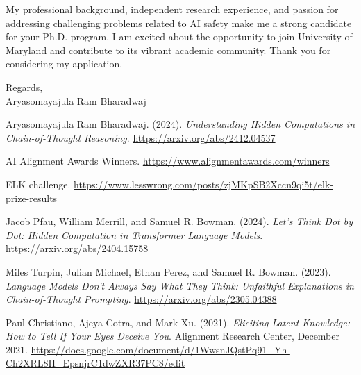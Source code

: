 \documentclass[12pt]{article}
\begin{document}
My professional background, independent research experience, and passion for addressing challenging problems related to AI safety make me a strong candidate for your Ph.D. program. I am excited about the opportunity to join University of Maryland and contribute to its vibrant academic community. Thank you for considering my application.

Regards,\\
Aryasomayajula Ram Bharadwaj

\newpage
\begin{thebibliography}{9}

Aryasomayajula Ram Bharadwaj. (2024). \emph{Understanding Hidden Computations in Chain-of-Thought Reasoning}.  
\url{https://arxiv.org/abs/2412.04537}

AI Alignment Awards Winners.  
\url{https://www.alignmentawards.com/winners}

ELK challenge.  
\url{https://www.lesswrong.com/posts/zjMKpSB2Xccn9qi5t/elk-prize-results}


Jacob Pfau, William Merrill, and Samuel R. Bowman. (2024). \emph{Let's Think Dot by Dot: Hidden Computation in Transformer Language Models}.  
\url{https://arxiv.org/abs/2404.15758}

Miles Turpin, Julian Michael, Ethan Perez, and Samuel R. Bowman. (2023). \emph{Language Models Don't Always Say What They Think: Unfaithful Explanations in Chain-of-Thought Prompting}.  
\url{https://arxiv.org/abs/2305.04388}

Paul Christiano, Ajeya Cotra, and Mark Xu. (2021). \emph{Eliciting Latent Knowledge: How to Tell If Your Eyes Deceive You}. Alignment Research Center, December 2021.  
\url{https://docs.google.com/document/d/1WwsnJQstPq91_Yh-Ch2XRL8H_EpsnjrC1dwZXR37PC8/edit}

\end{thebibliography}
\end{document}
